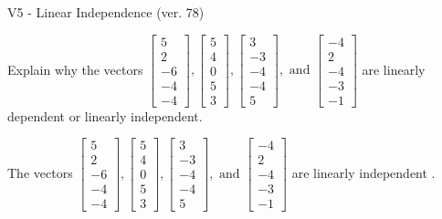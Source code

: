 \begin{exercise}
  \begin{exerciseTitle}V5 - Linear Independence (ver. 78)\end{exerciseTitle}
  \begin{exerciseStatement}
    Explain why the vectors \(\left[\begin{array}{r}
5 \\
2 \\
-6 \\
-4 \\
-4
\end{array}\right] , \left[\begin{array}{r}
5 \\
4 \\
0 \\
5 \\
3
\end{array}\right] , \left[\begin{array}{r}
3 \\
-3 \\
-4 \\
-4 \\
5
\end{array}\right] , \text{ and } \left[\begin{array}{r}
-4 \\
2 \\
-4 \\
-3 \\
-1
\end{array}\right]\) are linearly dependent or linearly independent.	


  \end{exerciseStatement}
  \begin{exerciseAnswer}
   The vectors \(\left[\begin{array}{r}
5 \\
2 \\
-6 \\
-4 \\
-4
\end{array}\right] , \left[\begin{array}{r}
5 \\
4 \\
0 \\
5 \\
3
\end{array}\right] , \left[\begin{array}{r}
3 \\
-3 \\
-4 \\
-4 \\
5
\end{array}\right] , \text{ and } \left[\begin{array}{r}
-4 \\
2 \\
-4 \\
-3 \\
-1
\end{array}\right]\) are 
  	 linearly independent  .
  


  \end{exerciseAnswer}
\end{exercise}